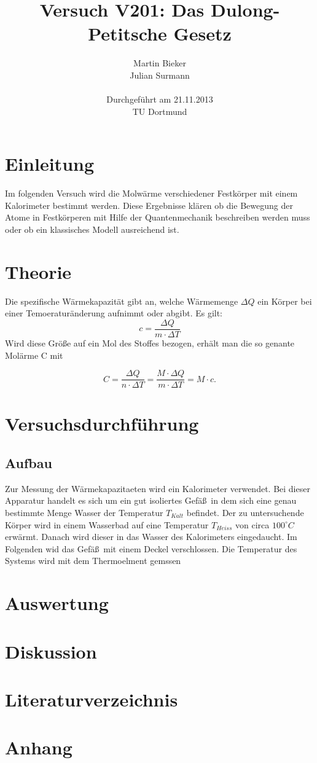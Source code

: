 \documentclass[11pt,ngerman,a4paper]{article}
\title{\textbf{Versuch V201: Das Dulong-Petitsche Gesetz}}
\author{Martin Bieker\\
		Julian Surmann\\
		\\
		Durchgef\"{u}hrt am 21.11.2013\\
		TU Dortmund}
\date{}
\begin{document}
\renewcommand\tablename{Tabelle}
\renewcommand\figurename{Abbildung}
\maketitle
\thispagestyle{empty}
\newpage
\clearpage
\setcounter{page}{1}


\section{Einleitung}

Im folgenden Versuch wird die Molw\"arme verschiedener Festk\"orper mit einem Kalorimeter bestimmt werden.  Diese Ergebnisse kl\"aren ob die Bewegung der Atome in Festk\"orperen mit Hilfe der Quantenmechanik beschreiben werden muss oder ob ein klassisches Modell ausreichend ist.
\section{Theorie}

Die spezifische W\"armekapazit\"at gibt an, welche W\"armemenge $\Delta Q$ ein K\"orper bei einer Temoeratur\"anderung aufnimmt oder abgibt. Es gilt:
\begin{equation}
c = \frac{\Delta Q}{m \cdot\Delta T}
\end{equation}
Wird diese Gr\"o\ss e auf ein Mol des Stoffes bezogen, erh\"alt man die so genante Mol\"arme C mit 

\begin{equation}
C = \frac{\Delta Q }{n\cdot \Delta T} =\frac{M\cdot \Delta Q}{m\cdot \Delta T} = M  \cdot c.
\end{equation}
\subsection{}
\section{Versuchsdurchf\"uhrung}

\subsection{Aufbau}
Zur Messung der W\"armekapazitaeten wird ein Kalorimeter verwendet. 
Bei dieser Apparatur handelt es sich um ein gut isoliertes Gef\"a\ss\ in dem sich eine genau bestimmte Menge Wasser der Temperatur $T_{Kalt}$ befindet. Der zu untersuchende K\"orper wird in einem Wasserbad auf eine Temperatur $T_{Heiss}$ von circa $100 ^\circ C$ erw\"armt. Danach wird dieser in das Wasser des Kalorimeters eingedaucht. Im Folgenden wid das Gef\"a\ss\ mit einem Deckel verschlossen. Die Temperatur des Systems wird mit dem Thermoelment gemssen
\section{Auswertung}

\section{Diskussion}


\section{Literaturverzeichnis}

\section{Anhang}
\end{document}
